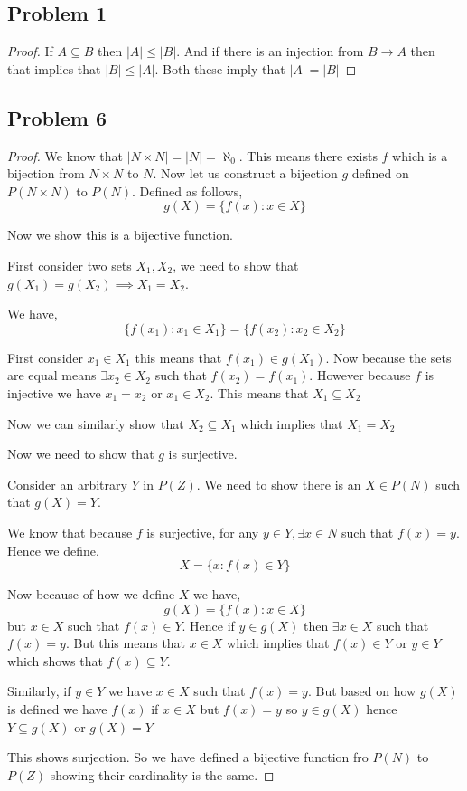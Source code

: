 \documentclass[a4paper]{report}
\begin{document}
\subsection*{Problem 1}

\begin{proof}
    If $A \subseteq B$ then $|A| \le |B|$. And if  there is an injection from  $B \rightarrow A$ then that implies that $|B| \le |A|$. Both these imply that  $|A| = |B|$
\end{proof}
\subsection*{Problem 6}
\begin{proof}
We know that $|N \times N| = |N| = \aleph_0$. This means there exists $f$ which is a bijection from $N \times  N$ to $N$. Now let us construct a bijection  $g $ defined on $P(N \times  N)$ to $P(N)$. Defined as follows,  
$$ g(X) = \{f(x): x \in X\} $$ 


Now we show this is a bijective function.

First consider two sets $X_1,X_2$, we need to show that $g(X_1) = g(X_2) \implies X_1 =X_2$.

We have, $$\{f(x_1): x_1 \in X_1\} = \{f(x_2): x_2 \in X_2\}$$


First consider $x_1 \in X_1$ this means that $f(x_1) \in g(X_1)$. Now because the sets are equal means $\exists x_2 \in X_2$ such that $f(x_2) = f(x_1)$. However because $f$ is injective we have $x_1 = x_2$ or $x_1 \in X_2$. This means that $X_1 \subseteq X_2$

Now we can similarly show that $X_2 \subseteq X_1$ which implies that $X_1 = X_2$

Now we need to show that $g$ is surjective.

Consider an arbitrary $Y$ in $P(Z)$. We need to show there is an $X \in P(N)$ such that $g(X) = Y$.

We know that because $f$ is surjective, for any $y \in Y, \exists x \in N$  such that $f(x) = y$. Hence we define, 
$$ X = \{x: f(x) \in Y\} $$ 

Now because of how we define $X$ we have, 
$$ g(X) = \{f(x): x \in X\} $$  but $x \in X$ such that $f(x) \in Y$. Hence  if $y \in g(X)$ then  $\exists x \in X$ such that $f(x) = y$. But this means that $x \in X$ which implies that $f(x) \in Y$ or $y \in Y$ which shows that  $f(x) \subseteq Y$.

Similarly, if  $y \in Y$ we have $x \in X$ such that $f(x) = y$. But based on how  $g(X)$ is defined we have $f(x)$ if $x \in X$ but $f(x) = y$ so $y \in g(X)$ hence $Y \subseteq g(X)$ or $ g(X) = Y$

This shows surjection. So we have defined a bijective function fro $P(N)$ to  $P(Z)$ showing their cardinality is the same.

\end{proof}
\end{document}
